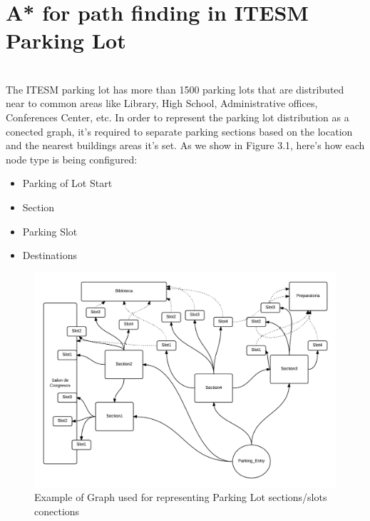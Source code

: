 \section{A* for path finding in ITESM Parking Lot}
\paragraph{} ~\\
The ITESM parking lot has more than 1500 parking lots that are distributed near to common areas like Library, High School, Administrative offices, Conferences Center, etc.
In order to represent the parking lot distribution as a conected graph, it's required to separate parking sections based on the location and the nearest buildings areas 
it's set.
As we show in Figure 3.1, here's how each node type is being configured:
\begin{itemize}
\item{Parking of Lot Start}
\item{Section}
\item{Parking Slot}
\item{Destinations}
\end{itemize}

\begin{figure}[H]
    \centering
    \includegraphics[width=1\textwidth]{images/parking_lot_diagram.png}
    \caption{Example of Graph used for representing Parking Lot sections/slots conections}
    \label{fig:parking_lot_diagram}
\end{figure}

